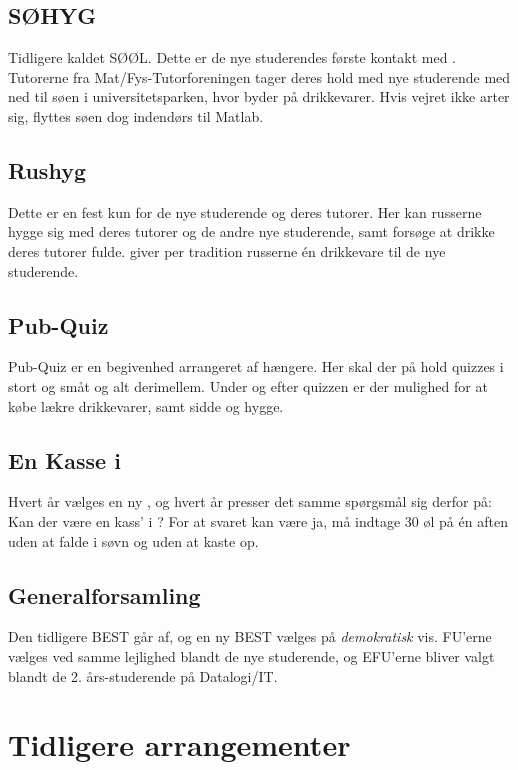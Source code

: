 \subsection{SØHYG}
Tidligere kaldet SØØL. Dette er de nye studerendes første kontakt med \TKET. Tutorerne fra Mat/Fys-Tutorforeningen tager deres hold med nye studerende med ned til søen i universitetsparken, hvor \TKET byder på drikkevarer. Hvis vejret ikke arter sig, flyttes søen dog indendørs til Matlab.

\subsection{Rushyg}
Dette er en fest kun for de nye studerende og deres tutorer. Her kan russerne hygge sig med deres tutorer og de andre nye studerende, samt forsøge at drikke deres tutorer fulde. \TKET giver per tradition russerne én drikkevare til de nye studerende.

\subsection{Pub-Quiz}
Pub-Quiz er en begivenhed arrangeret af hængere. Her skal der på hold quizzes i stort og småt og alt derimellem. Under og efter quizzen er der mulighed for at købe lækre drikkevarer, samt sidde og hygge.

\subsection{En Kasse i \KASS}
Hvert år vælges en ny \KASS, og hvert år presser det samme spørgsmål sig derfor på: Kan der være en kass' i \KASS? For at svaret kan være ja, må \KASS indtage 30 øl på én aften uden at falde i søvn og uden at kaste op.

\subsection{Generalforsamling}
Den tidligere BEST går af, og en ny BEST vælges på \textit{demokratisk} vis. FU'erne vælges ved samme lejlighed blandt de nye studerende, og EFU'erne bliver valgt blandt de 2. års-studerende på Datalogi/IT.

\section{Tidligere arrangementer}

